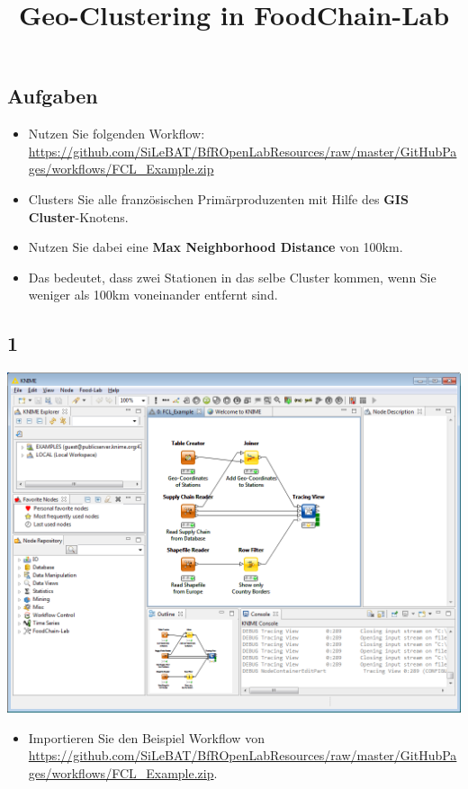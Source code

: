 \documentclass{beamer}
\title{Geo-Clustering in FoodChain-Lab}
\date{}
\begin{document}
\maketitle

\section{ }

\subsection{Aufgaben}
\begin{frame}
	\begin{itemize}
		\item Nutzen Sie folgenden Workflow: \url{https://github.com/SiLeBAT/BfROpenLabResources/raw/master/GitHubPages/workflows/FCL_Example.zip}
		\item Clusters Sie alle französischen Primärproduzenten mit Hilfe des \textbf{GIS Cluster}-Knotens.
		\item Nutzen Sie dabei eine \textbf{Max Neighborhood Distance} von 100km.
		\item Das bedeutet, dass zwei Stationen in das selbe Cluster kommen, wenn Sie weniger als 100km voneinander entfernt sind.
	\end{itemize}
\end{frame}
 
\subsection{1}
\begin{frame}
	\begin{center}
  		\includegraphics[height=0.6\textheight]{1.png}
	\end{center}
	\begin{itemize}
		\item Importieren Sie den Beispiel Workflow von \url{https://github.com/SiLeBAT/BfROpenLabResources/raw/master/GitHubPages/workflows/FCL_Example.zip}.
	\end{itemize}
\end{frame}
\end{document}
